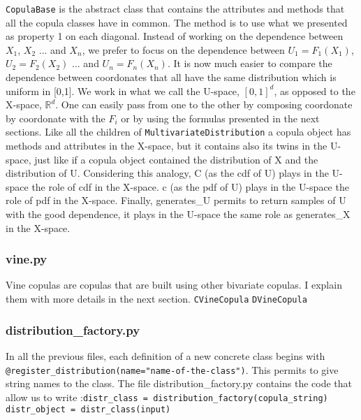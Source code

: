 \documentclass{article}
\begin{document}
	 \texttt{CopulaBase} is the abstract class that contains the attributes and methods that all the copula classes have in common. The method is to use what we presented as property 1 on each diagonal. Instead of working on the dependence between $X_1$, $X_2$ ... and $X_n$, we prefer to focus on the dependence between $U_1=F_1(X_1)$, $U_2=F_2(X_2)$ ... and $U_n=F_n(X_n)$. It is now much easier to compare the dependence between coordonates that all have the same distribution which is uniform in [0,1]. We work in what we call the U-space, $[0,1]^d$, as opposed to the X-space, $\mathbb{R}^d$. One can easily pass from one to the other by composing coordonate by coordonate with the $F_i$ or by using the formulas presented in the next sections. Like all the children of \texttt{MultivariateDistribution} a copula object has methods and attributes in the X-space, but it contains also its twins in the U-space, just like if a copula object contained the distribution of X and the distribution of U. Considering this analogy, C (as the cdf of U) plays in the U-space the role of cdf in the X-space. c (as the pdf of U) plays in the U-space the role of pdf in the X-space. Finally, generates\_U permits to return samples of U with the good dependence, it plays in the U-space the same role as generates\_X in the X-space.


	 \subsubsection{vine.py}
	 Vine copulas are copulas that are built using other bivariate copulas. I explain them with more details in the next section.\newline
	 \newline
	 \texttt{CVineCopula} \newline
	 \texttt{DVineCopula}

	\subsubsection{distribution\_factory.py}

	 In all the previous files, each definition of a new concrete class begins with \texttt{@register\_distribution(name="name-of-the-class")}. This permits to give string names to the class. The file distribution\_factory.py contains the code that allow us to write :\newline \texttt{distr\_class = distribution\_factory(copula\_string)}\newline
    \texttt{distr\_object = distr\_class(input)}\newline
\end{document}
